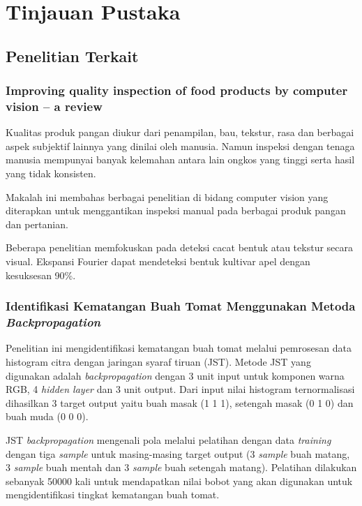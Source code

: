 \documentclass[laporan.tex]{subfiles}
\begin{document}
\chapter{Tinjauan Pustaka}

\section{Penelitian Terkait}

\subsection{Improving quality inspection of food products by computer vision – a review}

Kualitas produk pangan diukur dari penampilan, bau, tekstur, rasa dan berbagai aspek subjektif lainnya yang dinilai oleh manusia. Namun inspeksi dengan tenaga manusia mempunyai banyak kelemahan antara lain ongkos yang tinggi serta  hasil yang tidak konsisten.

Makalah ini\cite{brosnan} membahas berbagai penelitian di bidang computer vision yang diterapkan untuk menggantikan inspeksi manual pada berbagai produk pangan dan pertanian.

Beberapa penelitian memfokuskan pada deteksi cacat bentuk atau tekstur secara visual. Ekspansi Fourier dapat mendeteksi bentuk kultivar apel dengan kesuksesan 90\%.

\subsection{Identifikasi Kematangan Buah Tomat Menggunakan Metoda \emph{Backpropagation}}

Penelitian ini mengidentifikasi kematangan buah tomat melalui pemrosesan data histogram citra dengan jaringan syaraf tiruan (JST). Metode JST yang digunakan adalah \emph{backpropagation} dengan 3 unit input untuk komponen warna RGB, 4 \emph{hidden layer} dan 3 unit output. Dari input nilai histogram ternormalisasi dihasilkan 3 target output yaitu buah masak (1 1 1), setengah masak (0 1 0) dan buah muda (0 0 0).\cite{derisma}

JST \emph{backpropagation} mengenali pola melalui pelatihan dengan data \emph{training} dengan tiga \emph{sample} untuk masing-masing target output (3 \emph{sample} buah matang, 3 \emph{sample} buah mentah dan 3 \emph{sample} buah setengah matang). Pelatihan dilakukan sebanyak 50000 kali untuk mendapatkan nilai bobot yang akan digunakan untuk mengidentifikasi tingkat kematangan buah tomat.
\end{document}
